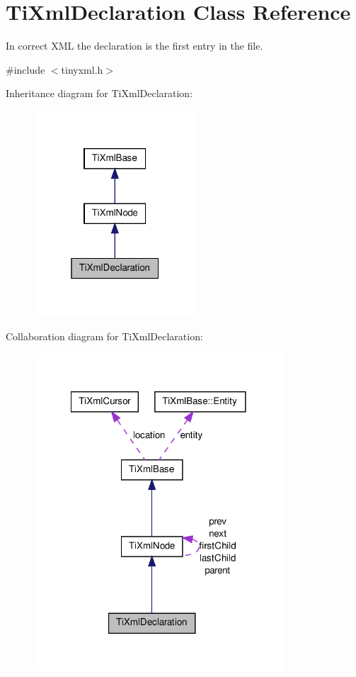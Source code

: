 \hypertarget{classTiXmlDeclaration}{
\section{TiXmlDeclaration Class Reference}
\label{d2/df2/classTiXmlDeclaration}
}


In correct XML the declaration is the first entry in the file.  




{\ttfamily \#include $<$tinyxml.h$>$}



Inheritance diagram for TiXmlDeclaration:
\nopagebreak
\begin{figure}[H]
\begin{center}
\leavevmode
\includegraphics[width=172pt]{d3/dbe/classTiXmlDeclaration__inherit__graph}
\end{center}
\end{figure}


Collaboration diagram for TiXmlDeclaration:
\nopagebreak
\begin{figure}[H]
\begin{center}
\leavevmode
\includegraphics[width=264pt]{df/ddc/classTiXmlDeclaration__coll__graph}
\end{center}
\end{figure}
